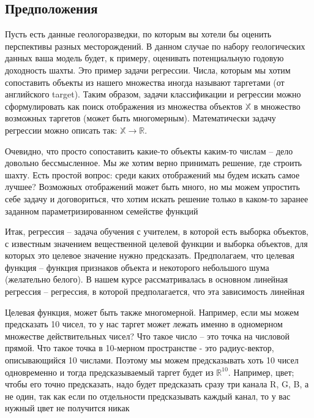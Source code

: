 \documentclass[a4paper, 14pt]{article}
\begin{document}
    \subsection{Предположения}
    
    Пусть есть данные геологоразведки, по которым вы хотели бы оценить перспективы разных месторождений.
    В данном случае по набору геологических данных ваша модель будет, к примеру, оценивать потенциальную годовую
    доходность шахты.
    Это пример задачи регрессии.
    Числа, которым мы хотим сопоставить объекты из нашего множества иногда называют таргетами (от английского target).
    Таким образом, задачи классификации и регрессии можно сформулировать как поиск отображения из множества объектов
    $\mathbb{X}$ в множество возможных таргетов (может быть многомерным).
    Математически задачу регрессии можно описать так: $\mathbb{X} \rightarrow \mathbb{R}$.
    
    Очевидно, что просто сопоставить какие-то объекты каким-то числам -- дело довольно бессмысленное.
    Мы же хотим верно принимать решение, где строить шахту.
    Есть простой вопрос: среди каких отображений мы будем искать самое лучшее?
    Возможных отображений может быть много, но мы можем упростить себе задачу и договориться, что хотим искать
    решение только в каком-то заранее заданном параметризированном семействе функций
    
    Итак, регрессия -- задача обучения с учителем, в которой есть выборка объектов, с известным значением
    вещественной целевой функции и выборка объектов, для которых это целевое значение нужно предсказать.
    Предполагаем, что целевая функция -- функция признаков объекта и некоторого небольшого шума (желательно белого).
    В нашем курсе рассматривалась в основном линейная регрессия -- регрессия, в которой предполагается, что эта
    зависимость линейная
    
    Целевая функция, может быть также многомерной.
    Например, если мы можем предсказать 10 чисел, то у нас таргет может лежать именно в одномерном множестве
    действительных чисел?
    Что такое число -- это точка на числовой прямой.
    Что такое точка в 10-мерном пространстве - это радиус-вектор, описывающийся 10 числами.
    Поэтому мы можем предсказывать хоть 10 чисел одновременно и тогда предсказываемый таргет будет из $\mathbb{R}^{10}$.
    Например, цвет; чтобы его точно предсказать, надо будет предсказать сразу три канала R, G, B, а не один, так как
    если по отдельности предсказывать каждый канал, то у вас нужный цвет не получится никак
    
\end{document}
